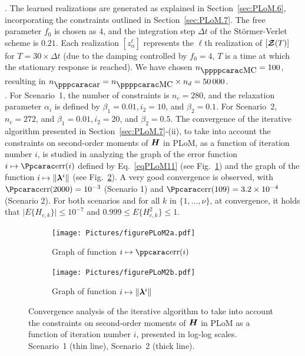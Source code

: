 .
The learned realizations are generated as explained in Section~\ref{sec:PLoM.6}, incorporating the constraints outlined in Section~\ref{sec:PLoM.7}. The free parameter $f_0$ is chosen as $4$, and the integration step $\Delta t$ of the St\"{o}rmer-Verlet scheme
is $0.21$. Each realization $[z_\alpha^\ell]$ represents  the $\ell$th realization of $[{\boldsymbol{\mathcal{Z}}}(T)]$ for $T = 30 \times \Delta t$ (due to the damping controlled by $f_0=4$, $T$ is a time at which the stationary response is reached). We have chosen $n_\MC = 100$,  resulting in $n_\ar = n_\MC\times n_d = 50\, 000$. \\


.
For Scenario~1, the number of constraints is $n_c = 280$, and the relaxation parameter $\alpha_i$ is defined by $\beta_1=0.01, i_2=10$,
and $\beta_2=0.1$. For Scenario~2, $n_c = 272$, and $\beta_1=0.01, i_2=20$, and $\beta_2=0.5$.
%
The convergence of the iterative algorithm presented in Section~\ref{sec:PLoM.7}-(ii), to take into account the constraints on second-order moments of ${\boldsymbol{H}}$ in PLoM, as a function of iteration number $i$, is studied in analyzing the graph of the error function $i\mapsto\err(i)$ defined by Eq.~\eqref{eqPLoM11} (see Fig.~\ref{fig:figurePLoM2a}) and the graph of the function $i\mapsto \Vert{\boldsymbol{\lambda}}^i\Vert$ (see Fig.~\ref{fig:figurePLoM2b}). A very good convergence is observed, with $\err(2000) = 10^{-3}$ (Scenario 1) and $\err(109) = 3.2\times 10^{-4}$ (Scenario 2).
%
For  both  scenarios and for all $k$ in $\{1,\ldots , \nu\}$,  at convergence, it holds that  $\vert E\{ H_{c,k}\}\vert \leq 10^{-7}$ and $0.999 \leq E\{ H_{c,k}^2\} \leq 1$.\\
%
\begin{figure}[!htb]
    \begin{center}
        \begin{subfigure}[b]{0.40\textwidth}
            \begin{center}
                \texttt{[image: Pictures/figurePLoM2a.pdf]}
            \end{center}
                \caption{Graph of function $i\mapsto\errp(i)$}
                \label{fig:figurePLoM2a}
            \end{subfigure}
            \begin{subfigure}[b]{0.40\textwidth}
                \begin{center}
                    \texttt{[image: Pictures/figurePLoM2b.pdf]}
                \end{center}
                \caption{Graph of function $i\mapsto \Vert{\boldsymbol{\lambda}}^i\Vert$}
                \label{fig:figurePLoM2b}
            \end{subfigure}
    \end{center}
    \caption[Convergence analysis of the iterative algorithm.]{Convergence analysis of the iterative algorithm to take into account the constraints on second-order moments of ${\boldsymbol{H}}$ in PLoM as a function of iteration number $i$, presented in log-log scales. Scenario~1 (thin line), Scenario~2 (thick line).}
    \label{fig:figurePLoM2}
\end{figure}

